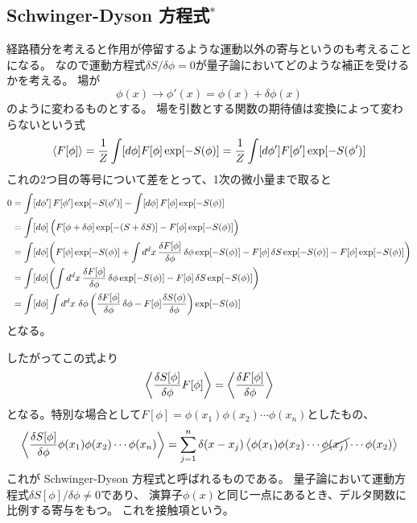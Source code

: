 \documentclass[../../master.tex]{subfiles}
\begin{document}
\subsection*{Schwinger-Dyson 方程式\(^*\)}
経路積分を考えると作用が停留するような運動以外の寄与というのも考えることになる。
なので運動方程式\(\delta S/\delta \phi =0\)が量子論においてどのような補正を受けるかを考える。
場が
\begin{equation*}
    \phi(x)\rightarrow\phi'(x)=\phi(x)+\delta\phi(x)
\end{equation*}
のように変わるものとする。
場を引数とする関数の期待値は変換によって変わらないという式
\begin{equation*}
    \ev{F[\phi]}
    = \frac{1}{Z}\int[d\phi]F[\phi]\exp[-S(\phi)]
    = \frac{1}{Z}\int[d\phi']F[\phi']\exp[-S(\phi')]
\end{equation*}
これの2つ目の等号について差をとって、1次の微小量まで取ると
\begin{align*}
    0
    &=\int[d\phi']\,F[\phi']\exp[-S(\phi')]-\int[d\phi]\,F[\phi]\exp[-S(\phi)]\\
    &=\int[d\phi]\,\Bigr(F[\phi+\var{\phi}]\exp[-(S+\var{S})]-F[\phi]\exp[-S(\phi)]\Bigl)\\
    &=\int[d\phi] \qty(F[\phi]\exp[-S(\phi)]
        +\int d^dx\, \fdv{F[\phi]}{\phi}\var{\phi}\exp[-S(\phi)]
        -F[\phi]\var{S}\exp[-S(\phi)]
        -F[\phi]\exp[-S(\phi)])\\
    &=\int[d\phi] \qty(\int d^dx\, \fdv{F[\phi]}{\phi}\var{\phi}\exp[-S(\phi)]
        -F[\phi]\var{S}\exp[-S(\phi)])\\
    &=\int[d\phi] \int d^dx\,\var{\phi} \qty(\fdv{F[\phi]}{\phi}\var{\phi}
        -F[\phi]\fdv{S(\phi)}{\phi})\exp[-S(\phi)]
\end{align*}
となる。

したがってこの式より
\begin{equation*}
    \ev{\fdv{S[\phi]}{\phi}F[\phi]} = \ev{\fdv{F[\phi]}{\phi}}
\end{equation*}
となる。特別な場合として\(F[\phi]=\phi(x_1)\phi(x_2)\cdots\phi(x_n)\)としたもの、
\begin{equation*}
    \ev{\fdv{S[\phi]}{\phi}\phi(x_1)\phi(x_2)\cdots\phi(x_n)}
    =\sum_{j=1}^{n} \delta(x-x_j)\ev{\phi(x_1)\phi(x_2)\cdots\cancel{\phi(x_j)}\cdots\phi(x_2)}
\end{equation*}
これが Schwinger-Dyson 方程式と呼ばれるものである。
量子論において運動方程式\(\delta S[\phi] /\delta \phi\neq 0\)であり、
演算子\(\phi(x)\)と同じ一点にあるとき、デルタ関数に比例する寄与をもつ。
これを接触項という。
\end{document}
